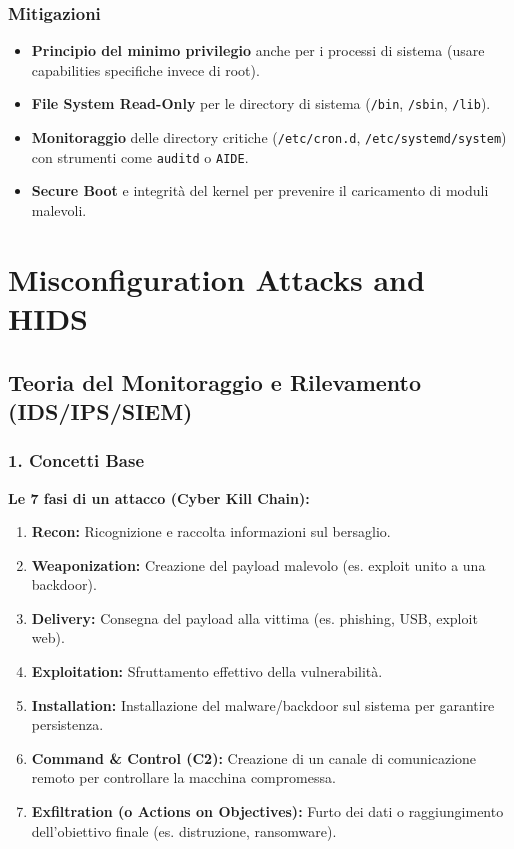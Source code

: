 \documentclass[12pt, a4paper]{report}
\begin{document}
\subsection{Mitigazioni}
\begin{itemize}
	\item \textbf{Principio del minimo privilegio} anche per i processi di sistema (usare capabilities specifiche invece di root).
	\item \textbf{File System Read-Only} per le directory di sistema (\texttt{/bin}, \texttt{/sbin}, \texttt{/lib}).
	\item \textbf{Monitoraggio} delle directory critiche (\texttt{/etc/cron.d}, \texttt{/etc/systemd/system}) con strumenti come \texttt{auditd} o \texttt{AIDE}.
	\item \textbf{Secure Boot} e integrità del kernel per prevenire il caricamento di moduli malevoli.
\end{itemize}

\chapter{Misconfiguration Attacks and HIDS}

\section{Teoria del Monitoraggio e Rilevamento (IDS/IPS/SIEM)}

\subsection{1. Concetti Base}

\textbf{Le 7 fasi di un attacco (Cyber Kill Chain):}
\begin{enumerate}
	\item \textbf{Recon:} Ricognizione e raccolta informazioni sul bersaglio.
	\item \textbf{Weaponization:} Creazione del payload malevolo (es. exploit unito a una backdoor).
	\item \textbf{Delivery:} Consegna del payload alla vittima (es. phishing, USB, exploit web).
	\item \textbf{Exploitation:} Sfruttamento effettivo della vulnerabilità.
	\item \textbf{Installation:} Installazione del malware/backdoor sul sistema per garantire persistenza.
	\item \textbf{Command \& Control (C2):} Creazione di un canale di comunicazione remoto per controllare la macchina compromessa.
	\item \textbf{Exfiltration (o Actions on Objectives):} Furto dei dati o raggiungimento dell'obiettivo finale (es. distruzione, ransomware).
\end{enumerate}
\end{document}
